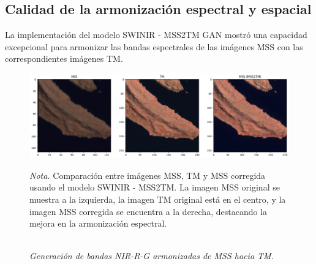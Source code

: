         \subsection{Calidad de la armonización espectral y espacial}
            La implementación del modelo SWINIR - MSS2TM GAN mostró una capacidad excepcional para armonizar las bandas espectrales de las imágenes MSS con las correspondientes imágenes TM. 

            \begin{figure}[H] 
                \caption{\doublespacing \\ \textit{Generación de bandas NIR-R-G armonizadas de MSS hacia TM.}} 
                \centering
                \includegraphics[width=1\linewidth]{2_CAPITULO5/IMG/espectral.png}
                \begin{justify}
                    \textit{Nota.} Comparación entre imágenes MSS, TM y MSS corregida usando el modelo SWINIR - MSS2TM. La imagen MSS original se muestra a la izquierda, la imagen TM original está en el centro, y la imagen MSS corregida se encuentra a la derecha, destacando la mejora en la armonización espectral.
                \end{justify}                    
                \label{armonizacion}
            \end{figure}
            
